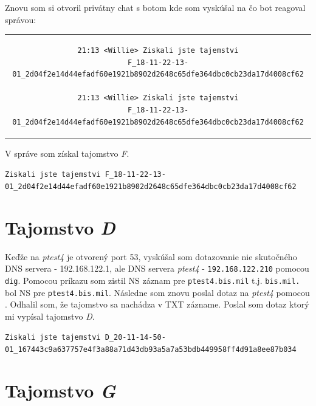 \documentclass[11pt,a4paper]{article}
\begin{document}
Znovu som si otvoril privátny chat s botom kde som vyskúšal  na čo bot reagoval správou:

\begin{center}
\begin{tabular}{c}
\begin{lstlisting}[basicstyle=\footnotesize]
21:13 <Willie> Ziskali jste tajemstvi
F_18-11-22-13-01_2d04f2e14d44efadf60e1921b8902d2648c65dfe364dbc0cb23da17d4008cf62

21:13 <Willie> Ziskali jste tajemstvi
F_18-11-22-13-01_2d04f2e14d44efadf60e1921b8902d2648c65dfe364dbc0cb23da17d4008cf62
\end{lstlisting}
\end{tabular}
\end{center}

V správe som získal tajomstvo \textit{F}.

\begin{center}
\small{\texttt{Ziskali jste tajemstvi F\_18-11-22-13-01\_2d04f2e14d44efadf60e1921b8902d2648c65dfe364dbc0cb23da17d4008cf62}}
\end{center}

\section{Tajomstvo \textit{D}}\label{sec:D}

Keďže na \textit{ptest4} je otvorený port 53, vyskúšal som dotazovanie nie skutočného DNS servera - 192.168.122.1, ale DNS servera \textit{ptest4} - \texttt{192.168.122.210} pomocou \texttt{dig}. Pomocou príkazu  som zistil NS záznam pre \texttt{ptest4.bis.mil} t.j. \texttt{bis.mil.} bol NS pre \texttt{ptest4.bis.mil}. Následne som znovu poslal dotaz na \textit{ptest4} pomocou . Odhalil som, že tajomstvo sa nachádza v TXT zázname. Poslal som dotaz  ktorý mi vypísal tajomstvo \textit{D}.

\begin{center}
\small{\texttt{Ziskali jste tajemstvi D\_20-11-14-50-01\_167443c9a637757e4f3a88a71d43db93a5a7a53bdb449958ff4d91a8ee87b034}}
\end{center}

\section{Tajomstvo \textit{G}}\label{sec:G}
\end{document}
